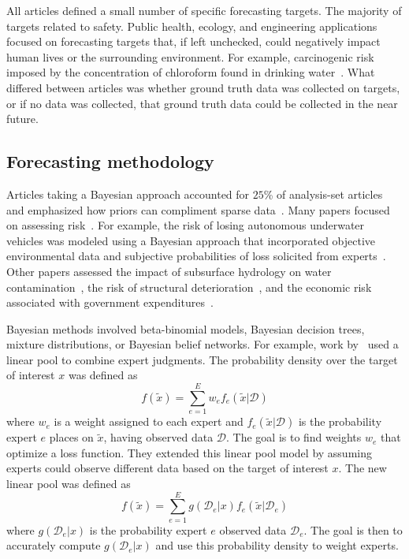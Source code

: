 \documentclass[preprint,authoryear]{elsarticle}
\def\l{\left}
\def\r{\right}
\begin{document}
All articles defined a small number of specific forecasting targets.
The majority of targets related to safety.
Public health, ecology, and engineering applications focused on forecasting targets that, if left unchecked, could negatively impact human lives or the surrounding environment.
For example, carcinogenic risk imposed by the concentration of chloroform found in drinking water~\cite{evans1994use}.
What differed between articles was whether ground truth data was collected on targets, or if no data was collected, that ground truth data could be collected in the near future.

\subsection{Forecasting methodology}

Articles taking a Bayesian approach accounted for $25$\% of analysis-set articles and emphasized how priors can compliment sparse data~\citep{zio1997accounting,bolger2017deriving,ISI:000296286100010,tartakovsky2007probabilistic,huang2016improving,neves2008life,abramson1996hailfinder,ren2002optimal,mantyka2014understanding,brito2016bayesian,wang2018bayesian,brito2012behavioral}.
Many papers focused on assessing risk~\citep{zio1997accounting,brito2016bayesian,brito2012behavioral,tartakovsky2007probabilistic}.
For example, the risk of losing autonomous underwater vehicles was modeled using a Bayesian approach that incorporated objective environmental data and subjective probabilities of loss solicited from experts~\citep{brito2016bayesian,brito2012behavioral}.
Other papers assessed the impact of subsurface hydrology on water contamination~\citep{tartakovsky2007probabilistic}, the risk of structural deterioration~\cite{neves2008life}, and the economic risk associated with government expenditures~\cite{wang2018bayesian}.

Bayesian methods involved beta-binomial models, Bayesian decision trees, mixture distributions, or Bayesian belief networks.
For example, work by~\cite{zio1997accounting} used a linear pool to combine expert judgments.
The probability density over the target of interest $x$ was defined as
\begin{equation*}
  f(\tilde{x}) = \sum_{e=1}^{E} w_{e} f_{e}\l( \tilde{x} | \mathcal{D} \r)
\end{equation*}
where $w_{e}$ is a weight assigned to each expert and $f_{e}\l( \tilde{x} | \mathcal{D} \r)$ is the probability expert $e$ places on $\tilde{x}$, having observed data $\mathcal{D}$.
The goal is to find weights $w_{e}$ that optimize a loss function.
They extended this linear pool model by assuming experts could observe different data based on the target of interest $x$.
The new linear pool was defined as
\begin{equation*}
  f(\tilde{x}) = \sum_{e=1}^{E} g( \mathcal{D}_{e} | x ) f_{e}\l( \tilde{x} | \mathcal{D}_{e} \r)
\end{equation*}
where $g(\mathcal{D}_{e}|x)$ is the probability expert $e$ observed data $\mathcal{D}_{e}$.
The goal is then to accurately compute $g( \mathcal{D}_{e} | x ) $ and use this probability density to weight experts.
\end{document}
